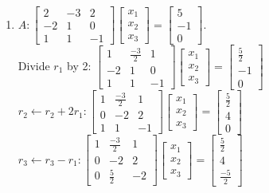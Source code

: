 \documentclass{article}
\begin{document}
\begin{enumerate}
	\item $A: 
	\begin{bmatrix}
		2	&-3	&2\\
		-2	&1	&0\\
		1	&1	&-1
	\end{bmatrix}
	\begin{bmatrix}
		x_1\\
		x_2\\
		x_3
	\end{bmatrix}
	= 
	\begin{bmatrix}
		5\\
		-1\\
		0
	\end{bmatrix}
	$. \\
	Divide $r_1$ by 2: $
	\begin{bmatrix}
		1	&\frac{-3}{2}	&1\\
		-2	&1	&0\\
		1	&1	&-1
	\end{bmatrix}
	\begin{bmatrix}
		x_1\\
		x_2\\
		x_3
	\end{bmatrix}
	= 
	\begin{bmatrix}
		\frac{5}{2}\\
		-1\\
		0
	\end{bmatrix}
	$\\
	$r_2 \leftarrow r_2 + 2r_1:
	\begin{bmatrix}
		1	&\frac{-3}{2}	&1\\
		0	&-2	&2\\
		1	&1	&-1
	\end{bmatrix}
	\begin{bmatrix}
		x_1\\
		x_2\\
		x_3
	\end{bmatrix}
	= 
	\begin{bmatrix}
		\frac{5}{2}\\
		4\\
		0
	\end{bmatrix}
	$\\
	$r_3 \leftarrow r_3 - r_1:
	\begin{bmatrix}
		1	&\frac{-3}{2}	&1\\
		0	&-2	&2\\
		0	&\frac{5}{2}	&-2
	\end{bmatrix}
	\begin{bmatrix}
		x_1\\
		x_2\\
		x_3
	\end{bmatrix}
	= 
	\begin{bmatrix}
		\frac{5}{2}\\
		4\\
		\frac{-5}{2}
	\end{bmatrix}
	$
	

\end{enumerate}
\end{document}
